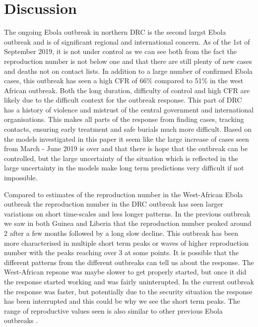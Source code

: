 \documentclass[12pt]{article}
\begin{document}
\section{Discussion}


The ongoing Ebola outbreak in northern DRC is the second largst Ebola outbreak and is of significant regional and international concern. As of the 1st of September 2019, it is not under control as we can see both from the fact the reproduction number is not below one and that there are still plenty of new cases and deaths not on contact lists. In addition to a large number of confirmed Ebola cases, this outbreak has seen a high CFR of 66\% compared to 51\% in the west African outbreak\cite{rojekSystematicReviewMetaanalysis2019}. Both the long duration, difficulty of control and high CFR are likely due to the difficult context for the outbreak response. This part of DRC has a history of violence and mistrust of the central government and international organisations. This makes all parts of the response from finding cases, tracking contacts, ensuring early treatment and safe burials much more difficult. Based on the models investigated in this paper it seem like the large increase of cases seen from March - June 2019 is over and that there is hope that the outbreak can be controlled, but the large uncertainty of the situation which is reflected in the large uncertainty in the models make long term predictions very difficult if not impossible.

Compared to estimates of the reproduction number in the West-African Ebola outbreak\cite{WestAfricanEbola2015} the reproduction number in the DRC outbreak has seen larger variations on short time-scales and less longer patterns. In the previous outbreak we saw in both Guinea and Liberia that the reproduction number peaked around 2 after a few months followed by a long slow decline. This outbreak has been more characterised in multiple short term peaks or waves of higher reproduction number with the peaks reaching over 3 at some points. It is possible that the different patterns from the different outbreaks can tell us about the response. The West-African repsone was maybe slower to get properly started, but once it did the response started working and was fairly uninterupted. In the current outbreak the response was faster, but potentially due to the security situation the response has been interrupted and this could be why we see the short term peaks. The range of reproductive values seen is also similar to other previous Ebola outbreaks \cite{legrandUnderstandingDynamicsEbola2007}.
\end{document}
